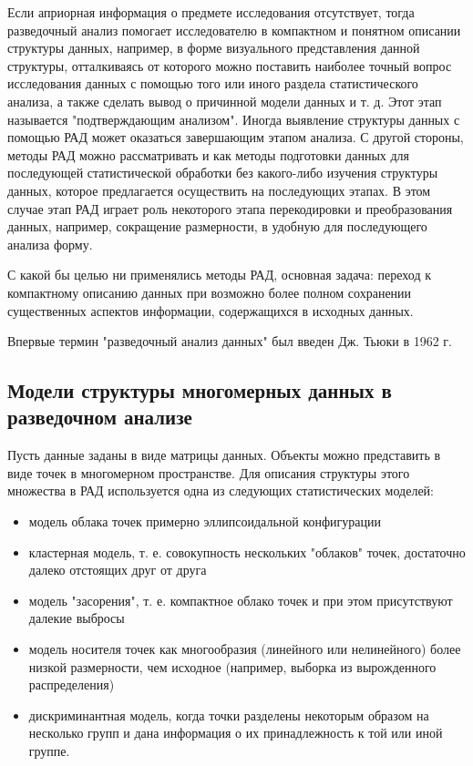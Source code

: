 \documentclass[a4paper, 12pt]{article}
\begin{document}
Если априорная информация о предмете исследования отсутствует, тогда разведочный анализ помогает исследователю в компактном и понятном описании структуры данных, например, в форме визуального представления данной структуры, отталкиваясь от которого можно поставить наиболее точный вопрос исследования данных с помощью того или иного раздела статистического анализа, а также сделать вывод о причинной модели данных и т. д. Этот этап называется "подтверждающим анализом". Иногда выявление структуры данных с помощью РАД может оказаться завершающим этапом анализа. С другой стороны, методы РАД можно рассматривать и как методы подготовки данных для последующей статистической обработки без какого-либо изучения структуры данных, которое предлагается осуществить на последующих этапах. В этом случае этап РАД играет роль некоторого этапа перекодировки и преобразования данных, например, сокращение размерности, в удобную для последующего анализа форму. 

С какой бы целью ни применялись методы РАД, основная задача: переход к компактному описанию данных при возможно более полном сохранении существенных аспектов информации, содержащихся в исходных данных.

Впервые термин "разведочный анализ данных" был введен Дж. Тьюки в 1962 г.

\subsection{Модели структуры многомерных данных в разведочном анализе}

Пусть данные заданы в виде матрицы данных. Объекты можно представить в виде точек в многомерном пространстве. Для описания структуры этого множества в РАД используется одна из следующих статистических моделей:
\begin{itemize}
	\item модель облака точек примерно эллипсоидальной конфигурации
	\item кластерная модель, т. е. совокупность нескольких "облаков" точек, достаточно далеко отстоящих друг от друга
	\item модель "засорения", т. е. компактное облако точек и при этом присутствуют далекие выбросы
	\item модель носителя точек как многообразия (линейного или нелинейного) более низкой размерности, чем исходное (например, выборка из вырожденного распределения)
	\item дискриминантная модель, когда точки разделены некоторым образом на несколько групп и дана информация о их принадлежность к той или иной группе.
\end{itemize}
\end{document}
